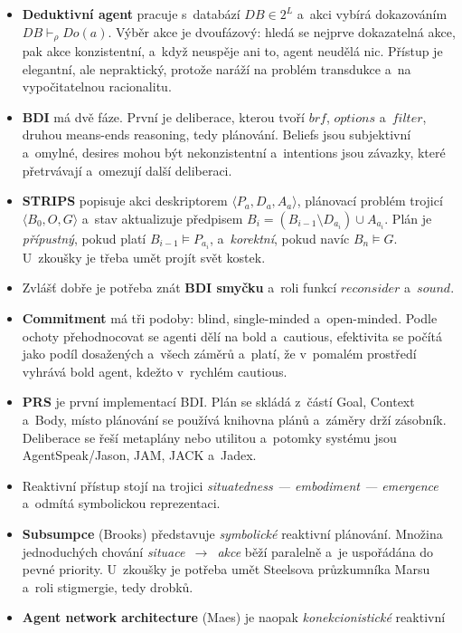 \documentclass[11pt,a4paper]{article}
\theoremstyle{definition}
\begin{document}
\begin{itemize}
\item \textbf{Deduktivní agent} pracuje s~databází $\mathit{DB} \in 2^L$ a~akci vybírá
  dokazováním $\mathit{DB} \vdash_\rho \mathit{Do}(a)$. Výběr akce je dvoufázový: hledá se
  nejprve dokazatelná akce, pak akce konzistentní, a~když neuspěje ani to, agent neudělá nic.
  Přístup je elegantní, ale nepraktický, protože naráží na problém transdukce a~na
  vypočitatelnou racionalitu.
\item \textbf{BDI} má dvě fáze. První je deliberace, kterou tvoří $\mathit{brf}$,
  $\mathit{options}$ a~$\mathit{filter}$, druhou means-ends reasoning, tedy plánování. Beliefs
  jsou subjektivní a~omylné, desires mohou být nekonzistentní a~intentions jsou závazky, které
  přetrvávají a~omezují další deliberaci.
\item \textbf{STRIPS} popisuje akci deskriptorem $\langle P_a,D_a,A_a\rangle$, plánovací problém
  trojicí $\langle B_0,O,G\rangle$ a~stav aktualizuje předpisem
  $B_i = (B_{i-1}\setminus D_{a_i})\cup A_{a_i}$. Plán je \emph{přípustný}, pokud platí
  $B_{i-1}\models P_{a_i}$, a~\emph{korektní}, pokud navíc $B_n \models G$. U~zkoušky je třeba
  umět projít svět kostek.
\item Zvlášť dobře je potřeba znát \textbf{BDI smyčku} a~roli funkcí $\mathit{reconsider}$
  a~$\mathit{sound}$.
\item \textbf{Commitment} má tři podoby: blind, single-minded a~open-minded. Podle ochoty
  přehodnocovat se agenti dělí na bold a~cautious, efektivita se počítá jako podíl dosažených
  a~všech záměrů a~platí, že v~pomalém prostředí vyhrává bold agent, kdežto v~rychlém cautious.
\item \textbf{PRS} je první implementací BDI. Plán se skládá z~částí Goal, Context a~Body, místo
  plánování se používá knihovna plánů a~záměry drží zásobník. Deliberace se řeší metaplány nebo
  utilitou a~potomky systému jsou AgentSpeak/Jason, JAM, JACK a~Jadex.
\item Reaktivní přístup stojí na trojici \emph{situatedness --- embodiment --- emergence}
  a~odmítá symbolickou reprezentaci.
\item \textbf{Subsumpce} (Brooks) představuje \emph{symbolické} reaktivní plánování. Množina
  jednoduchých chování \emph{situace~$\to$~akce} běží paralelně a~je uspořádána do pevné
  priority. U~zkoušky je potřeba umět Steelsova průzkumníka Marsu a~roli stigmergie, tedy
  drobků.
\item \textbf{Agent network architecture} (Maes) je naopak \emph{konekcionistické} reaktivní

\end{itemize}
\end{document}
